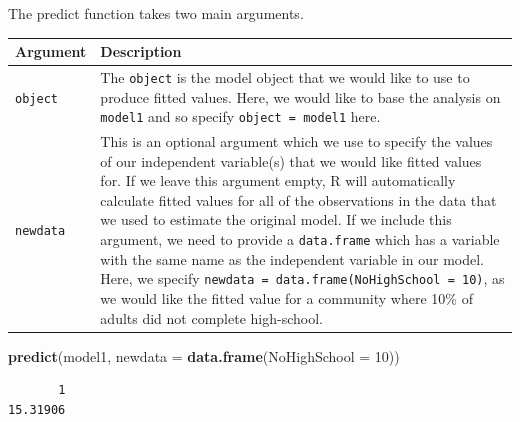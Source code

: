 \documentclass[]{article}
\newenvironment{Shaded}{\begin{snugshade}}{\end{snugshade}}
\newcommand{\KeywordTok}[1]{\textcolor[rgb]{0.13,0.29,0.53}{\textbf{#1}}}
\newcommand{\DataTypeTok}[1]{\textcolor[rgb]{0.13,0.29,0.53}{#1}}
\newcommand{\DecValTok}[1]{\textcolor[rgb]{0.00,0.00,0.81}{#1}}
\newcommand{\NormalTok}[1]{#1}
\theoremstyle{definition}
\theoremstyle{definition}
\theoremstyle{definition}
\theoremstyle{remark}
\begin{document}
The predict function takes two main arguments.

\begin{longtable}[]{@{}ll@{}}
\toprule
\begin{minipage}[b]{0.12\columnwidth}\raggedright\strut
Argument\strut
\end{minipage} & \begin{minipage}[b]{0.78\columnwidth}\raggedright\strut
Description\strut
\end{minipage}\tabularnewline
\midrule
\endhead
\begin{minipage}[t]{0.12\columnwidth}\raggedright\strut
\texttt{object}\strut
\end{minipage} & \begin{minipage}[t]{0.78\columnwidth}\raggedright\strut
The \texttt{object} is the model object that we would like to use to
produce fitted values. Here, we would like to base the analysis on
\texttt{model1} and so specify \texttt{object\ =\ model1} here.\strut
\end{minipage}\tabularnewline
\begin{minipage}[t]{0.12\columnwidth}\raggedright\strut
\texttt{newdata}\strut
\end{minipage} & \begin{minipage}[t]{0.78\columnwidth}\raggedright\strut
This is an optional argument which we use to specify the values of our
independent variable(s) that we would like fitted values for. If we
leave this argument empty, R will automatically calculate fitted values
for all of the observations in the data that we used to estimate the
original model. If we include this argument, we need to provide a
\texttt{data.frame} which has a variable with the same name as the
independent variable in our model. Here, we specify
\texttt{newdata\ =\ data.frame(NoHighSchool\ =\ 10)}, as we would like
the fitted value for a community where 10\% of adults did not complete
high-school.\strut
\end{minipage}\tabularnewline
\bottomrule
\end{longtable}

\begin{Shaded}
\begin{Highlighting}[]
\KeywordTok{predict}\NormalTok{(model1, }\DataTypeTok{newdata =} \KeywordTok{data.frame}\NormalTok{(}\DataTypeTok{NoHighSchool =} \DecValTok{10}\NormalTok{))}
\end{Highlighting}
\end{Shaded}

\begin{verbatim}
       1 
15.31906 
\end{verbatim}
\end{document}
